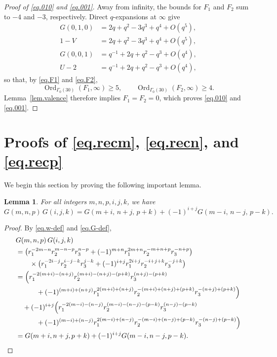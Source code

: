 \documentclass{amsart}
\newtheorem{lemma}[theorem]{Lemma}
\theoremstyle{definition}
\DeclareMathOperator{\Ord}{Ord}
\begin{document}
{{\begin{proof}[Proof of \eqref{eq.010} and \eqref{eq.001}]
Away from infinity, the bounds for $F_{1}$ and $F_{2}$ sum to $-4$
and $-3$, respectively.  
Direct $q$-expansions at $\infty$ give
\begin{align*}
G(0,1,0)&=2q+q^{2}-3q^{3}+q^{4}+O(q^{5}),\\
1-V     &=2q+q^{2}-3q^{3}+q^{4}+O(q^{5}),\\
G(0,0,1)&=q^{-1}+2q+q^{2}-q^{3}+O(q^{4}),\\
U-2     &=q^{-1}+2q+q^{2}-q^{3}+O(q^{4}),
\end{align*}
so that, by \eqref{eq.F1} and \eqref{eq.F2},
\begin{equation*}
\Ord_{\Gamma_{0}(30)}(F_{1},\infty)\geq5,
\qquad
\Ord_{\Gamma_{0}(30)}(F_{2},\infty)\geq4.
\end{equation*}
Lemma~\ref{lem.valence} therefore implies
$F_{1}=F_{2}=0$, which proves \eqref{eq.010} and \eqref{eq.001}.	

\end{proof}



\section{Proofs of \eqref{eq.recm}, \eqref{eq.recn}, and \eqref{eq.recp}}
\label{sec.product}
{We begin this section by proving the following important lemma.}
\begin{lemma}
For all integers $m,n,p,i,j,k$, we have
\begin{equation}
G(m,n,p)\,G(i,j,k)
=G(m+i,\,n+j,\,p+k)
+(-1)^{i+j}G(m-i,\,n-j,\,p-k).
\label{eq.productG}
\end{equation}
\end{lemma}

\begin{proof}
By \eqref{eq.w-def} and \eqref{eq.G-def},
\begin{align*}
&G(m,n,p)\,G(i,j,k)\\
&=\bigl(r_{1}^{-2m-n}r_{2}^{m-n-p}r_{3}^{n-p}
+(-1)^{m+n}r_{1}^{2m+n}r_{2}^{-m+n+p}r_{3}^{-n+p}\bigr)\\
&\qquad\times\bigl(r_{1}^{-2i-j}r_{2}^{i-j-k}r_{3}^{j-k}
+(-1)^{i+j}r_{1}^{2i+j}r_{2}^{-i+j+k}r_{3}^{-j+k}\bigr)\\
&=\Bigl(
r_{1}^{-2(m+i)-(n+j)}
r_{2}^{(m+i)-(n+j)-(p+k)}
r_{3}^{(n+j)-(p+k)}\\
&\qquad\quad
+(-1)^{(m+i)+(n+j)}
r_{1}^{2(m+i)+(n+j)}
r_{2}^{-(m+i)+(n+j)+(p+k)}
r_{3}^{-(n+j)+(p+k)}\Bigr)\\
&\quad+(-1)^{i+j}\Bigl(
r_{1}^{-2(m-i)-(n-j)}
r_{2}^{(m-i)-(n-j)-(p-k)}
r_{3}^{(n-j)-(p-k)}\\
&\qquad\quad
+(-1)^{(m-i)+(n-j)}
r_{1}^{2(m-i)+(n-j)}
r_{2}^{-(m-i)+(n-j)+(p-k)}
r_{3}^{-(n-j)+(p-k)}\Bigr)\\
&=G(m+i,n+j,p+k)
+(-1)^{i+j}G(m-i,n-j,p-k).
\end{align*}
\end{proof}

}}
\end{document}
